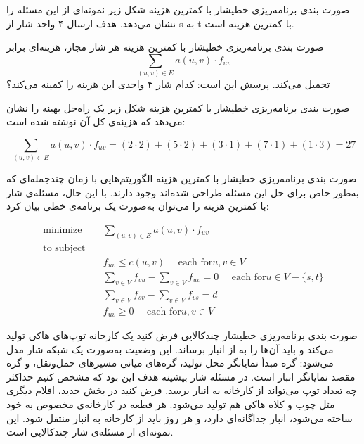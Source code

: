 \begin{itemframe-s}{صورت بندی برنامه‌ریزی خطی}{شار با کمترین هزینه}
\itm
شکل زیر نمونه‌ای از این مسئله را نشان می‌دهد. هدف ارسال ۴ واحد شار از s به t با کمترین هزینه است.


\end{itemframe-s}


\begin{itemframe-s}{صورت بندی برنامه‌ریزی خطی}{شار با کمترین هزینه}
\itm
هر شار مجاز، هزینه‌ای برابر
$$
\sum_{(u,v) \in E} a(u,v) \cdot f_{uv}
$$
تحمیل می‌کند.
\itm
پرسش این است: کدام شار ۴ واحدی این هزینه را کمینه می‌کند؟
\end{itemframe-s}


\begin{itemframe-s}{صورت بندی برنامه‌ریزی خطی}{شار با کمترین هزینه}
\itm
 شکل زیر یک راه‌حل بهینه را نشان می‌دهد که هزینه‌ی کل آن نوشته ‌شده است:

$$
\sum_{(u,v)\in E} a(u,v) \cdot f_{uv}
= (2 \cdot 2) + (5 \cdot 2) + (3 \cdot 1) + (7 \cdot 1) + (1 \cdot 3) = 27
$$


\end{itemframe-s}


\begin{itemframe-s}{صورت بندی برنامه‌ریزی خطی}{شار با کمترین هزینه}
\itm
الگوریتم‌هایی با زمان چندجمله‌ای که به‌طور خاص برای حل این مسئله طراحی شده‌اند وجود دارند. با این حال، مسئله‌ی شار با کمترین هزینه را می‌توان به‌صورت یک برنامه‌ی خطی بیان کرد:

\begin{align*}
\text{minimize} \quad
& \sum_{(u,v) \in E} a(u,v) \cdot f_{uv} \\
\text{to subject} \quad \\
& f_{uv} \leq c(u,v) \quad \text{ each for} u,v \in V \\
& \sum_{v \in V} f_{vu} - \sum_{v \in V} f_{uv} = 0
    \quad \text{ each for} u \in V - \{s,t\} \\
& \sum_{v \in V} f_{sv} - \sum_{v \in V} f_{vs} = d \\
& f_{uv} \geq 0 \quad \text{ each for} u,v \in V
\end{align*}


\end{itemframe-s}


\begin{itemframe-s}{صورت بندی برنامه‌ریزی خطی}{شار چندکالایی}
\itm
فرض کنید یک کارخانه توپ‌های هاکی تولید می‌کند و باید آن‌ها را به از انبار برساند.
این وضعیت به‌صورت یک شبکه شار مدل می‌شود: گره مبدأ نمایانگر محل تولید، گره‌های میانی مسیرهای حمل‌ونقل، و گره مقصد نمایانگر انبار است. در مسئله شار بیشینه هدف این بود که مشخص کنیم حداکثر چه تعداد توپ می‌تواند از کارخانه به انبار برسد.
\itm
فرض کنید در بخش جدید، اقلام دیگری مثل چوب و کلاه هاکی هم تولید می‌شود. هر قطعه در کارخانه‌ی مخصوص به خود ساخته می‌شود، انبار جداگانه‌ای دارد، و هر روز باید از کارخانه به انبار منتقل شود. این نمونه‌ای از مسئله‌ی شار چندکالایی
 است.
\end{itemframe-s}


